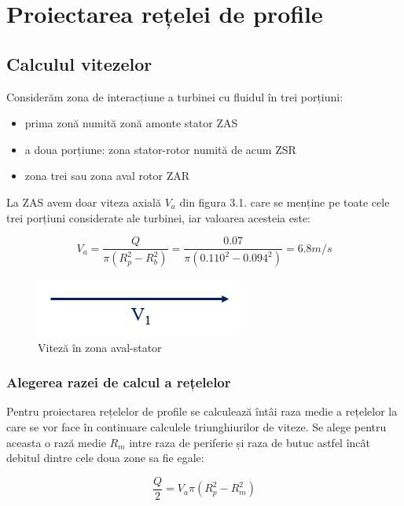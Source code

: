 \chapter{Proiectarea rețelei de profile} \label{chapter:proiectarea}

\section{Calculul vitezelor}

Considerăm zona de interacțiune a turbinei cu fluidul în trei porțiuni:
\begin{itemize}
	\item prima zonă numită zonă amonte stator ZAS
	\item a doua porțiune: zona stator-rotor numită de acum ZSR
	\item zona trei sau zona aval rotor ZAR
\end{itemize}

La ZAS avem doar viteza axială $V_{a}$ din figura 3.1. care se menține pe toate cele trei porțiuni considerate ale turbinei, iar valoarea acesteia este:

\begin{equation}
V_a=\frac{Q}{\pi(R_{p}^2 - R_{b}^2)} = \frac{0.07}{\pi(0.110^2 - 0.094^2)} = 6.8\si{m/s}
\end{equation}

\begin{figure}[h!]
	\centering
	\includegraphics[scale=0.55]{figures/triunghi_viteza_ZAS.jpg}
	\caption{Viteză în zona aval-stator}
	\label{Viteză în zona aval-stator}
\end{figure}

\subsection{Alegerea razei de calcul a rețelelor}

Pentru proiectarea rețelelor de profile se calculează întâi raza medie a rețelelor la care se vor face în continuare calculele triunghiurilor de viteze. Se alege pentru aceasta o rază medie $R_m$ intre raza de periferie și raza de butuc astfel încât debitul dintre cele doua zone sa fie egale:

\begin{equation}
\frac{Q}{2} = V_a \pi (R_p^2 - R_m^2) 
\end{equation}

